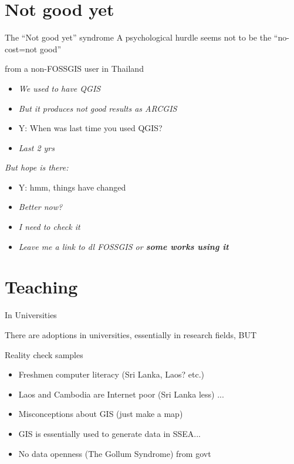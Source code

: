 \documentclass[xcolor=dvipsnames,beamer]{beamer} %
\begin{document}
\section{Not good yet}
\begin{frame}[fragile]{The ``Not good yet'' syndrome}
A psychological hurdle seems not to be the ``no-cost=not good''
\begin{block}{from a non-FOSSGIS user in Thailand}
\begin{itemize}
\item {\it We used to have QGIS} \\
\item {\it But it produces not good results as ARCGIS} \\
\item Y: When was last time you used QGIS? \\
\item {\it Last 2 yrs}
\end{itemize}
\end{block}

\begin{block}{{\it But hope is there:}}
\begin{itemize}
\item Y: hmm, things have changed
\item {\it Better now?}
\item {\it I need to check it}
\item {\it Leave me a link to dl FOSSGIS or {\bf some works using it}}
\end{itemize}
\end{block}

\end{frame}

\section{Teaching}
\begin{frame}[fragile]{In Universities}

There are adoptions in universities, essentially in research fields, BUT
\begin{block}{Reality check samples}
\begin{itemize}
 \item Freshmen computer literacy (Sri Lanka, Laos? etc.)
 \item Laos and Cambodia are Internet poor (Sri Lanka less) ... 
 \item Misconceptions about GIS (just make a map)
 \item GIS is essentially used to generate data in SSEA...
 \item No data openness (The Gollum Syndrome) from govt
\end{itemize}
\end{block}

\end{frame}
\end{document}
